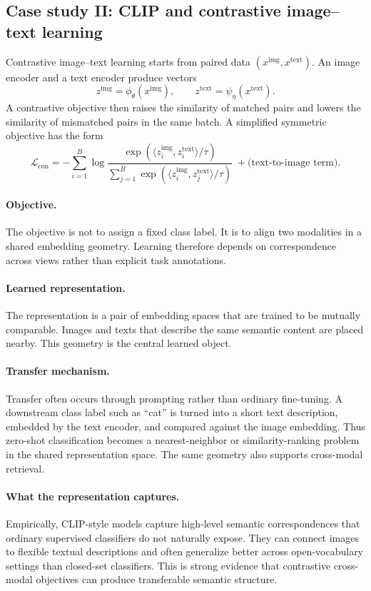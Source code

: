 \subsection*{Case study II: CLIP and contrastive image--text learning}

Contrastive image--text learning starts from paired data $(x^{\mathrm{img}},x^{\mathrm{text}})$.
An image encoder and a text encoder produce vectors
\[
z^{\mathrm{img}} = \phi_{\theta}(x^{\mathrm{img}}),
\qquad
z^{\mathrm{text}} = \psi_{\eta}(x^{\mathrm{text}}).
\]
A contrastive objective then raises the similarity of matched pairs and lowers the similarity of mismatched pairs in the same batch.
A simplified symmetric objective has the form
\[
\mathcal{L}_{\mathrm{con}}
=
-\sum_{i=1}^B
\log
\frac{\exp(\langle z^{\mathrm{img}}_i,z^{\mathrm{text}}_i\rangle/\tau)}
{\sum_{j=1}^B \exp(\langle z^{\mathrm{img}}_i,z^{\mathrm{text}}_j\rangle/\tau)}
\;+
\text{(text-to-image term)}.
\]

\paragraph{Objective.}
The objective is not to assign a fixed class label.
It is to align two modalities in a shared embedding geometry.
Learning therefore depends on correspondence across views rather than explicit task annotations.

\paragraph{Learned representation.}
The representation is a pair of embedding spaces that are trained to be mutually comparable.
Images and texts that describe the same semantic content are placed nearby.
This geometry is the central learned object.

\paragraph{Transfer mechanism.}
Transfer often occurs through prompting rather than ordinary fine-tuning.
A downstream class label such as ``cat'' is turned into a short text description, embedded by the text encoder, and compared against the image embedding.
Thus zero-shot classification becomes a nearest-neighbor or similarity-ranking problem in the shared representation space.
The same geometry also supports cross-modal retrieval.

\paragraph{What the representation captures.}
Empirically, CLIP-style models capture high-level semantic correspondences that ordinary supervised classifiers do not naturally expose.
They can connect images to flexible textual descriptions and often generalize better across open-vocabulary settings than closed-set classifiers.
This is strong evidence that contrastive cross-modal objectives can produce transferable semantic structure.

